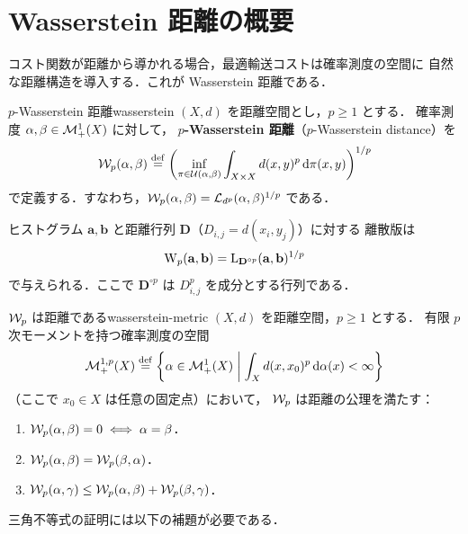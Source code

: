 \section{Wasserstein 距離の概要}
\label{sec:wasserstein-overview}

コスト関数が距離から導かれる場合，最適輸送コストは確率測度の空間に
自然な距離構造を導入する．これが Wasserstein 距離である．

\begin{definition}{$p$-Wasserstein 距離}{wasserstein}
  $(X, d)$ を距離空間とし，$p \geq 1$ とする．
  確率測度 $\alpha, \beta \in \mathcal{M}_+^1(X)$ に対して，
  \textbf{$p$-Wasserstein 距離}（$p$-Wasserstein distance）を
  \[
    \mathcal{W}_p(\alpha, \beta) \overset{\mathrm{def}}{=}
    \left(
    \inf_{\pi \in \mathcal{U}(\alpha, \beta)}
    \int_{X \times X} d(x, y)^p \, \mathrm{d}\pi(x, y)
    \right)^{1/p}
  \]
  で定義する．すなわち，$\mathcal{W}_p(\alpha, \beta) = \mathcal{L}_{d^p}(\alpha, \beta)^{1/p}$ である．

  ヒストグラム $\mathbf{a}, \mathbf{b}$ と距離行列 $\mathbf{D}$（$D_{i,j} = d(x_i, y_j)$）に対する
  離散版は
  \[
    \mathrm{W}_p(\mathbf{a}, \mathbf{b})
    = \mathrm{L}_{\mathbf{D}^{\circ p}}(\mathbf{a}, \mathbf{b})^{1/p}
  \]
  で与えられる．ここで $\mathbf{D}^{\circ p}$ は $D_{i,j}^p$ を成分とする行列である．
\end{definition}

\begin{proposition}{$\mathcal{W}_p$ は距離である}{wasserstein-metric}
  $(X, d)$ を距離空間，$p \geq 1$ とする．
  有限 $p$ 次モーメントを持つ確率測度の空間
  \[
    \mathcal{M}_+^{1,p}(X) \overset{\mathrm{def}}{=}
    \left\{ \alpha \in \mathcal{M}_+^1(X) \;\middle|\;
    \int_X d(x, x_0)^p \, \mathrm{d}\alpha(x) < \infty \right\}
  \]
  （ここで $x_0 \in X$ は任意の固定点）において，
  $\mathcal{W}_p$ は距離の公理を満たす：
  \begin{enumerate}
    \item $\mathcal{W}_p(\alpha, \beta) = 0 \iff \alpha = \beta$．
    \item $\mathcal{W}_p(\alpha, \beta) = \mathcal{W}_p(\beta, \alpha)$．
    \item $\mathcal{W}_p(\alpha, \gamma) \leq \mathcal{W}_p(\alpha, \beta) + \mathcal{W}_p(\beta, \gamma)$．
  \end{enumerate}
\end{proposition}

三角不等式の証明には以下の補題が必要である．

